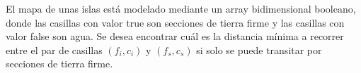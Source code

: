 El mapa de unas islas está modelado mediante un array bidimensional booleano, donde las casillas con valor true son secciones de tierra firme y las casillas con valor false son agua. Se desea encontrar cuál es la distancia mínima a recorrer entre el par de casillas \( (f_i, c_i) \) y \( (f_s, c_s) \) si solo se puede transitar por secciones de tierra firme.
